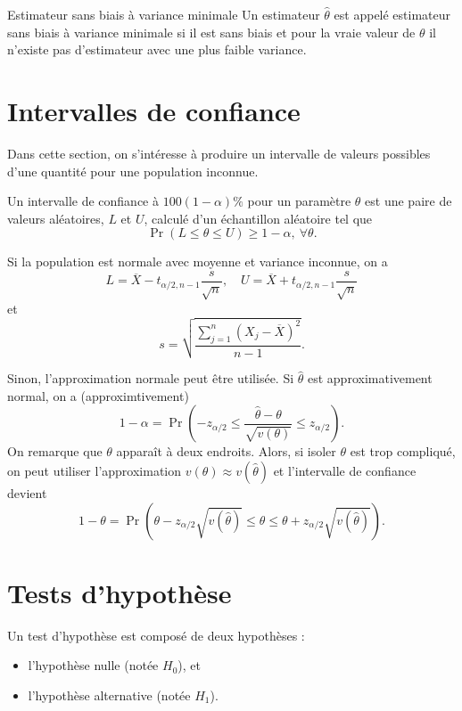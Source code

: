 \begin{definition}{Estimateur sans biais à variance minimale}{}
	Un estimateur $\hat{\theta}$ est appelé estimateur sans biais à variance minimale si il est sans biais et pour la vraie valeur de $\theta$ il n'existe pas d'estimateur avec une plus faible variance. 
\end{definition}

\section{Intervalles de confiance}

Dans cette section, on s'intéresse à produire un intervalle de valeurs possibles d'une quantité pour une population inconnue. 

\begin{definition}{}{}
	Un intervalle de confiance à $100(1-\alpha)\%$ pour un paramètre $\theta$ est une paire de valeurs aléatoires, $L$ et $U$, calculé d'un échantillon aléatoire tel que $$\Pr(L\leq \theta \leq U) \geq 1 - \alpha, ~\forall \theta.$$
\end{definition}

Si la population est normale avec moyenne et variance inconnue, on a 
$$L = \overline{X} - t_{\alpha / 2, n-1} \frac{s}{\sqrt{n}}, \quad U = \overline{X} + t_{\alpha / 2, n-1} \frac{s}{\sqrt{n}}$$
et
$$s = \sqrt{\frac{\sum_{j = 1}^{n}\left(X_j - \overline{X}\right)^2}{n-1}}.$$

Sinon, l'approximation normale peut être utilisée. Si $\hat{\theta}$ est approximativement normal, on a (approximtivement)
$$1 - \alpha = \Pr \left( -z_{\alpha / 2} \leq \frac{\hat{\theta} - \theta}{\sqrt{v(\theta)}} \leq z_{\alpha / 2}\right).$$
On remarque que $\theta$ apparaît à deux endroits. Alors, si isoler $\theta$ est trop compliqué, on peut utiliser l'approximation $v(\theta) \approx v(\hat{\theta})$ et l'intervalle de confiance devient
$$1 - \theta = \Pr\left(\theta - z_{\alpha / 2} \sqrt{v(\hat{\theta})} \leq \theta \leq \theta + z_{\alpha / 2} \sqrt{v(\hat{\theta})}\right).$$

\section{Tests d'hypothèse}

Un test d'hypothèse est composé de deux hypothèses :
\begin{itemize}
	\item l'hypothèse nulle (notée $H_0$), et
	\item l'hypothèse alternative (notée $H_1$).
\end{itemize}

